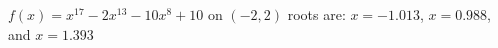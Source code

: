 {$f(x) = x^{17}-2x^{13}-10x^8+10$ on $(-2,2)$
}
{roots are: $x=-1.013$, $x=0.988$, and $x=1.393$
}

